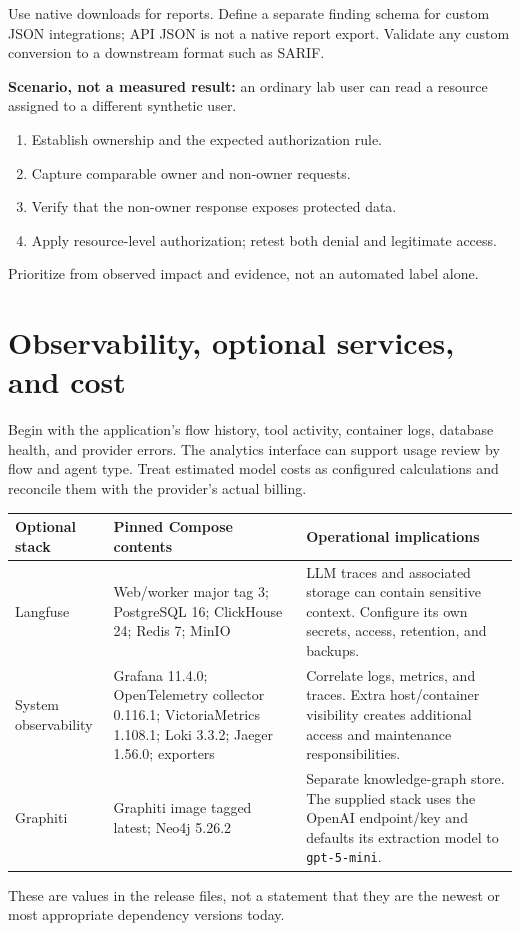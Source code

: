 \documentclass[11pt,letterpaper]{article}
\newcommand{\code}[1]{\nolinkurl{#1}}
\newcommand{\src}[1]{\cite{#1}}
\newcommand{\smallhead}[1]{\par\medskip{\sffamily\bfseries\color{Navy}#1}\par}
\begin{document}
Use native downloads for reports. Define a separate finding schema for custom
JSON integrations; API JSON is not a native report export. Validate any
custom conversion to a downstream format such as SARIF.

\smallhead{Illustrative finding review}
\textbf{Scenario, not a measured result:} an ordinary lab user can read a
resource assigned to a different synthetic user.

\begin{enumerate}
\item Establish ownership and the expected authorization rule.
\item Capture comparable owner and non-owner requests.
\item Verify that the non-owner response exposes protected data.
\item Apply resource-level authorization; retest both denial and legitimate access.
\end{enumerate}
Prioritize from observed impact and evidence, not an automated label alone.

\clearpage
\section{Observability, optional services, and cost}
\label{sec:observability}
Begin with the application's flow history, tool activity, container logs,
database health, and provider errors. The analytics interface can support usage
review by flow and agent type. Treat estimated model costs as configured
calculations and reconcile them with the provider's actual billing.
\src{analytics}

\begin{tabularx}{\textwidth}{@{}L{0.20\textwidth}L{0.32\textwidth}Y@{}}
\toprule
\textbf{Optional stack} & \textbf{Pinned Compose contents} & \textbf{Operational implications}\\
\midrule
Langfuse &
Web/worker major tag 3; PostgreSQL 16; ClickHouse 24; Redis 7; MinIO &
LLM traces and associated storage can contain sensitive context.
Configure its own secrets, access, retention, and backups.\\
System observability &
Grafana 11.4.0; OpenTelemetry collector 0.116.1; VictoriaMetrics 1.108.1;
Loki 3.3.2; Jaeger 1.56.0; exporters &
Correlate logs, metrics, and traces. Extra host/container visibility creates
additional access and maintenance responsibilities.\\
Graphiti &
Graphiti image tagged latest; Neo4j 5.26.2 &
Separate knowledge-graph store. The supplied stack uses the OpenAI endpoint/key
and defaults its extraction model to \code{gpt-5-mini}.\\
\bottomrule
\end{tabularx}
{\small These are values in the release files, not a statement that they are
the newest or most appropriate dependency versions today.
\src{langfuse,observability,graphiti}}
\end{document}
